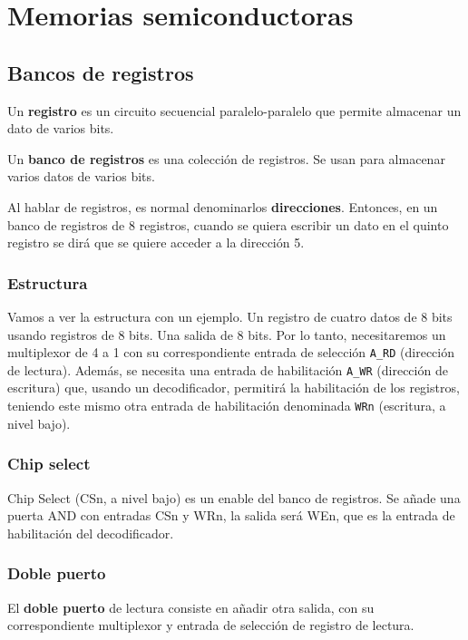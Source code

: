 \documentclass[a4paper]{book}
\begin{document}
\setlength{\parskip}{0em}
\tableofcontents 
\setlength{\parskip}{0.5em}

\chapter{Memorias semiconductoras}
\section{Bancos de registros}
Un \textbf{registro} es un circuito secuencial paralelo-paralelo que permite almacenar un dato de varios bits.

Un \textbf{banco de registros} es una colección de registros. Se usan para almacenar varios datos de varios bits.

Al hablar de registros, es normal denominarlos \textbf{direcciones}. Entonces, en un banco de registros de 8 registros, cuando se quiera escribir un dato en el quinto registro se dirá que se quiere acceder a la dirección 5.

\subsection{Estructura}

Vamos a ver la estructura con un ejemplo. Un registro de cuatro datos de 8 bits usando registros de 8 bits. Una salida de 8 bits. Por lo tanto, necesitaremos un multiplexor de 4 a 1 con su correspondiente entrada de selección \verb|A_RD| (dirección de lectura). Además, se necesita una entrada de habilitación \verb|A_WR| (dirección de escritura) que, usando un decodificador, permitirá la habilitación de los registros, teniendo este mismo otra entrada de habilitación denominada \verb|WRn| (escritura, a nivel bajo).

\subsection{Chip select}

Chip Select (CSn, a nivel bajo) es un enable del banco de registros. Se añade una puerta AND con entradas CSn y WRn, la salida será WEn, que es la entrada de habilitación del decodificador.

\subsection{Doble puerto}

El \textbf{doble puerto} de lectura consiste en añadir otra salida, con su correspondiente multiplexor y entrada de selección de registro de lectura.
\end{document}
